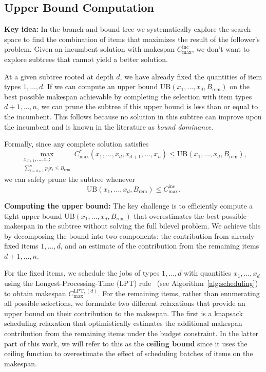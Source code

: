 \subsection{Upper Bound Computation}

\textbf{Key idea:} In the branch-and-bound tree we systematically explore the search space to find the combination of items that maximizes the result of the follower's problem. Given an incumbent solution with makespan $C_{\max}^{\text{inc}}$, we don't want to explore subtrees that cannot yield a better solution. 

At a given subtree rooted at depth $d$, we have already fixed the quantities of item types $1, \ldots, d$. If we can compute an upper bound $\text{UB}(x_1, \ldots, x_d, B_{\text{rem}})$ on the best possible makespan achievable by completing the selection with item types $d+1, \ldots, n$, we can prune the subtree if this upper bound is less than or equal to the incumbent. This follows because no solution in this subtree can improve upon the incumbent and is known in the literature as \emph{bound dominance}.

Formally, since any complete solution satisfies
\begin{equation}
\max_{\substack{x_{d+1}, \ldots, x_n: \\ \sum_{i=d+1}^{n} p_i x_i \leq B_{\text{rem}}}} C_{\max}^*(x_1, \ldots, x_d, x_{d+1}, \ldots, x_n) \leq \text{UB}(x_1, \ldots, x_d, B_{\text{rem}}),
\end{equation}
we can safely prune the subtree whenever
\begin{equation}
\text{UB}(x_1, \ldots, x_d, B_{\text{rem}}) \leq C_{\max}^{\text{inc}}.
\end{equation}

\textbf{Computing the upper bound:}
The key challenge is to efficiently compute a tight upper bound $\text{UB}(x_1, \ldots, x_d, B_{\text{rem}})$ that overestimates the best possible makespan in the subtree without solving the full bilevel problem. 
We achieve this by decomposing the bound into two components: 
the contribution from already-fixed items $1, \ldots, d$, and an estimate of the contribution from the remaining items $d+1, \ldots, n$.

For the fixed items, we schedule the jobs of types $1, \ldots, d$ with quantities $x_1, \ldots, x_d$ using the Longest-Processing-Time (LPT) rule~\cite{graham1969bounds} (see Algorithm~\ref{alg:scheduling}) 
to obtain makespan $C_{\max}^{\text{LPT},(d)}$. 
For the remaining items, rather than enumerating all possible selections, we formulate two different relaxations that provide an upper bound on their contribution to the makespan. 
The first is a knapsack scheduling relaxation that optimistically estimates the additional makespan contribution from the remaining items under the budget constraint. 
In the latter part of this work, we will refer to this as the \textbf{ceiling bound} since it uses the ceiling function to overestimate the effect of scheduling batches of items on the makespan.

